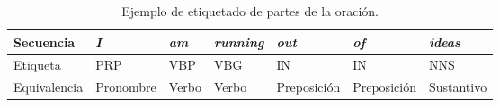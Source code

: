 
\begin{table}[h]
\caption{Ejemplo de etiquetado de partes de la oración.} \label{table:pos}
\begin{center}
\begin{tabular}{lllllll}
\hline
\textbf{Secuencia} & \textit{I} & \textit{am} & \textit{running} & \textit{out} & \textit{of} & \textit{ideas} \\ \hline
Etiqueta           & PRP        & VBP         & VBG              & IN           & IN          & NNS            \\ \hline
Equivalencia       & Pronombre  & Verbo       & Verbo            & Preposición  & Preposición & Sustantivo     \\ \hline
\end{tabular}
\end{center}
\end{table}
